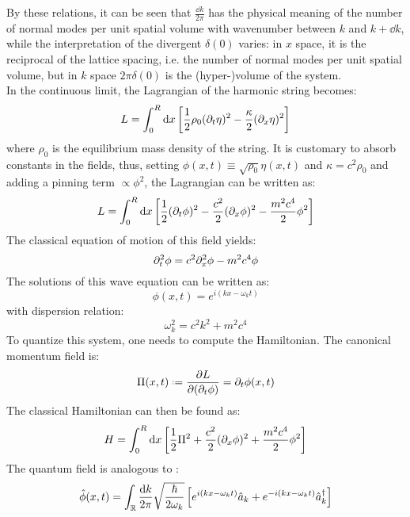 By these relations, it can be seen that $ \frac{\dd k}{2\pi} $ has the physical meaning of the number of normal modes per unit spatial volume with wavenumber between $ k $ and $ k + \dd k $, while the interpretation of the divergent $ \delta(0) $ varies: in $ x $ space, it is the reciprocal of the lattice spacing, i.e. the number of normal modes per unit spatial volume, but in $ k $ space $ 2\pi \delta(0) $ is the (hyper-)volume of the system.\\
In the continuous limit, the Lagrangian of the harmonic string becomes:
\begin{equation*}
  L = \int_0^R \mathrm{d} x \left[ \frac{1}{2} \rho_0 (\partial_t \eta)^2 - \frac{\kappa}{2} (\partial_x \eta)^2 \right]
\end{equation*}
where $ \rho_0 $ is the equilibrium mass density of the string. It is customary to absorb constants in the fields, thus, setting $ \phi(x,t) \equiv \sqrt{\rho_0} \eta(x,t) $ and $ \kappa = c^2 \rho_0 $ and adding a pinning term $ \propto \phi^2 $, the Lagrangian can be written as:
\begin{equation}
  L = \int_0^R \mathrm{d} x \left[ \frac{1}{2} (\partial_t \phi)^2 - \frac{c^2}{2} (\partial_x \phi)^2 - \frac{m^2 c^4}{2} \phi^2 \right]
\end{equation}
The classical equation of motion of this field yields:
\begin{equation}
  \partial_t^2 \phi = c^2 \partial_x^2 \phi - m^2 c^4 \phi
\end{equation}
The solutions of this wave equation can be written as:
\begin{equation}
  \phi(x,t) = e^{i \left( kx - \omega_k t \right)}
\end{equation}
with dispersion relation:
\begin{equation}
  \omega_k^2 = c^2 k^2 + m^2 c^4
\end{equation}
To quantize this system, one needs to compute the Hamiltonian. The canonical momentum field is:
\begin{equation}
  \Pi(x,t) \defeq \frac{\pa L}{\pa (\pa_t \phi)} = \pa_t \phi(x,t)
\end{equation}
The classical Hamiltonian can then be found as:
\begin{equation}
  H = \int_0^R \mathrm{d} x \left[ \frac{1}{2} \Pi^2 + \frac{c^2}{2} (\partial_x \phi)^2 + \frac{m^2 c^4}{2} \phi^2 \right]
\end{equation}
The quantum field is analogous to :
\begin{equation}
  \hat\phi(x,t) = \int_{\mathbb{R}} \frac{\mathrm{d} k}{2\pi} \sqrt{\frac{\hbar}{2\omega_k}} \left[ e^{i \left( kx - \omega_k t \right)} \hat{a}_k + e^{-i \left( kx - \omega_k t \right)} \hat{a}_k^\dagger \right]
\end{equation}
